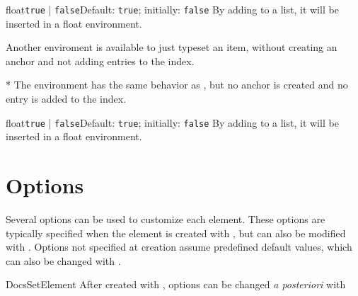 \documentclass[11pt, outputdir = ./out]{article}
\begin{document}
\begin{example}{}
    \begin{EnumItemOptiondef}{float}{\texttt{true} | \texttt{false}}{Default: \texttt{true}; initially: \texttt{false}}
        By adding  to a list, it will be inserted in a float environment.
    \end{EnumItemOptiondef}
\end{example}

Another enviroment is available to just typeset an item, without creating an anchor and not adding entries to the index.

\begin{Environmentenv}{*}{}{}
    The  environment has the same behavior as , but no anchor is created and no entry is added to the index.
\end{Environmentenv}

\begin{example}{}
    \begin{EnumItemOption*}{float}{\texttt{true} | \texttt{false}}{Default: \texttt{true}; initially: \texttt{false}}
        By adding  to a list, it will be inserted in a float environment.
    \end{EnumItemOption*}
\end{example}


\section{Options}\label{sec:options}

Several options can be used to customize each element. These options are typically specified when the element is created with , but can also be modified with . Options not specified at creation assume predefined default values, which can also be changed with .

\begin{Macrodef}{DocsSetElement}{}{}
    After created with , options can be changed \textit{a posteriori} with 
\end{Macrodef}
\end{document}
